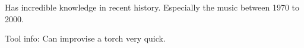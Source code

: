 \begin{npcBox}[title=Lost: Falko]
    \begin{stressSection}
    \end{stressSection}
    \begin{tabularx}{\textwidth}{ XX }
    \end{tabularx}

    \begin{consequences}
    \item {}
    \item {}
    \item {}
    \end{consequences}

    \begin{npcDescription}

    Has incredible knowledge in recent history. Especially the music between 1970 to 2000.

    Tool info: Can improvise a torch very quick.

    \end{npcDescription}

\end{npcBox}


\newpage


